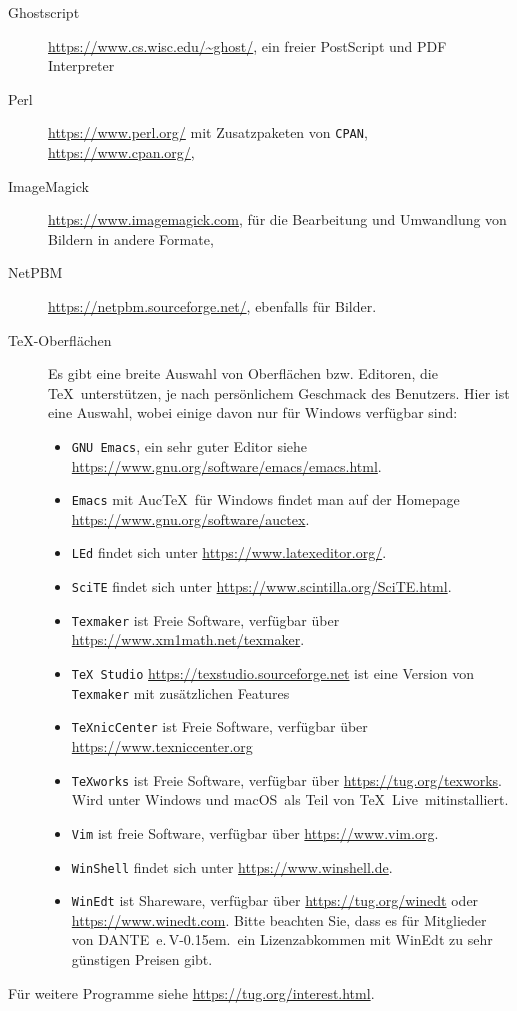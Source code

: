 \documentclass[12pt,ngerman,a4paper,fullparskip]{scrreprt}
\newcommand{\TL}{\TeX\ Live\xspace}
\newcommand{\acro}[1]{\texttt{#1}}
\newcommand{\cmdname}[1]{\texttt{#1}}
\providecommand*{\macOS}{macOS\xspace}
\newcommand{\dante}{DANTE~e.\,V\kern-0.15em.}
\begin{document}
\begin{description}
\item[Ghostscript] \url{https://www.cs.wisc.edu/~ghost/}, ein freier PostScript und PDF Interpreter
\item[Perl] \url{https://www.perl.org/} mit Zusatzpaketen von
      \acro{CPAN}, \url{https://www.cpan.org/},
\item[ImageMagick] \url{https://www.imagemagick.com}, für die Bearbeitung
      und Umwandlung von Bildern in andere Formate,
\item[NetPBM] \url{https://netpbm.sourceforge.net/}, ebenfalls für Bilder.

\item[\TeX-Oberflächen] Es gibt eine breite Auswahl von Oberflächen bzw.
     Editoren, die \TeX\ unterstützen, je nach persönlichem Geschmack des
     Benutzers. Hier ist eine Auswahl, wobei einige davon nur für Windows verfügbar sind:
  \begin{itemize}
  \item \cmdname{GNU Emacs}, ein sehr guter Editor siehe
        \url{https://www.gnu.org/software/emacs/emacs.html}.
  \item \cmdname{Emacs} mit Auc\TeX\ für Windows findet man auf der Homepage  \url{https://www.gnu.org/software/auctex}.
  \item \cmdname{LEd} findet sich unter \url{https://www.latexeditor.org/}.
  \item \cmdname{SciTE} findet sich unter
        \url{https://www.scintilla.org/SciTE.html}.
  \item \cmdname{Texmaker} ist Freie Software, verfügbar über
        \url{https://www.xm1math.net/texmaker}.
  \item \cmdname{TeX Studio} \url{https://texstudio.sourceforge.net}
        ist eine Version von \cmdname{Texmaker} mit zusätzlichen Features
  \item \cmdname{TeXnicCenter} ist Freie Software, verfügbar über
        \url{https://www.texniccenter.org}
  \item \cmdname{TeXworks} ist Freie Software, verfügbar über
        \url{https://tug.org/texworks}. Wird unter Windows und
        \macOS\ als Teil von \TL\  mitinstalliert.
  \item \cmdname{Vim} ist freie Software, verfügbar über
        \url{https://www.vim.org}.
  \item \cmdname{WinShell} findet sich unter \url{https://www.winshell.de}.
  \item \cmdname{WinEdt} ist Shareware, verfügbar über
        \url{https://tug.org/winedt} oder \url{https://www.winedt.com}.
        Bitte beachten Sie, dass es für Mitglieder von \dante\ ein
        Lizenzabkommen mit WinEdt zu sehr günstigen Preisen gibt. 
  \end{itemize}
\end{description}
Für weitere Programme siehe \url{https://tug.org/interest.html}.
\end{document}
